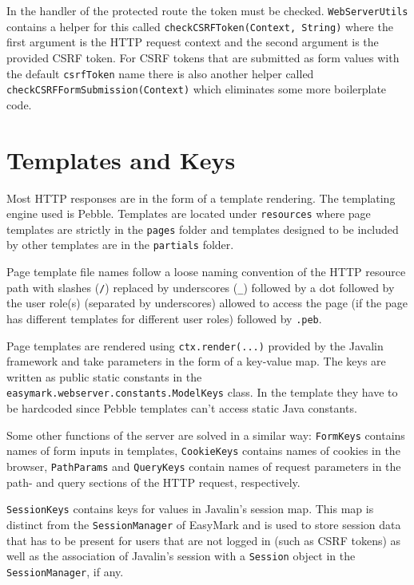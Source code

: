 \documentclass[12pt,a4paper]{report}
\begin{document}
	In the handler of the protected route the token must be checked. \lstinline|WebServerUtils| contains a helper for this called \lstinline|checkCSRFToken(Context, String)| where the first argument is the HTTP request context and the second argument is the provided CSRF token. For CSRF tokens that are submitted as form values with the default \lstinline|csrfToken| name there is also another helper called \lstinline|checkCSRFFormSubmission(Context)| which eliminates some more boilerplate code.

	\section{Templates and Keys}
	Most HTTP responses are in the form of a template rendering. The templating engine used is Pebble. Templates are located under \lstinline|resources| where page templates are strictly in the \lstinline|pages| folder and templates designed to be included by other templates are in the \lstinline|partials| folder.

	Page template file names follow a loose naming convention of the HTTP resource path with slashes (\lstinline|/|) replaced by underscores (\lstinline|_|) followed by a dot followed by the user role(s) (separated by underscores) allowed to access the page (if the page has different templates for different user roles) followed by \lstinline|.peb|.

	Page templates are rendered using \lstinline|ctx.render(...)| provided by the Javalin framework and take parameters in the form of a key-value map. The keys are written as public static constants in the \lstinline|easymark.webserver.constants.ModelKeys| class. In the template they have to be hardcoded since Pebble templates can't access static Java constants.

	Some other functions of the server are solved in a similar way: \lstinline|FormKeys| contains names of form inputs in templates, \lstinline|CookieKeys| contains names of cookies in the browser, \lstinline|PathParams| and \lstinline|QueryKeys| contain names of request parameters in the path- and query sections of the HTTP request, respectively.

	\lstinline|SessionKeys| contains keys for values in Javalin's session map. This map is distinct from the \lstinline|SessionManager| of EasyMark and is used to store session data that has to be present for users that are not logged in (such as CSRF tokens) as well as the association of Javalin's session with a \lstinline|Session| object in the \lstinline|SessionManager|, if any.
\end{document}
